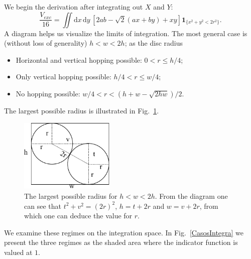 \documentclass[superscriptaddress,pre,reprint,showpacs,twocolumn]{revtex4-1}
\newcommand{\rd}[1]{\mathrm{d}{#1} \,}
\newcommand{\indicatorsymbol}{\mathbf{1}}
\newcommand{\indicator}[1]{\indicatorsymbol_{ \{   #1 \} } }
\begin{document}
We begin the derivation after integrating out $X$ and $Y$:
\begin{equation}\label{volgral2d}
\frac{V_{exc}}{16}  =\iint \rd x \rd y \left[ 2ab-\sqrt{2}(ax+by)+x y \right]
\indicator{x^2+y^2 < 2r^2 }.
\end{equation}
A diagram helps us visualize the limits of integration. The most general
case is (without loss of generality) $h < w < 2h$; as the disc radius 
\begin{itemize}
\item Horizontal and vertical hopping possible: $0 <r \leq h/4$;
\item Only vertical hopping possible: $h/4 < r \leq w/4$;
\item No hopping possible: $w/4 < r < (h+w - \sqrt{2hw}) / 2$.
\end{itemize}
The largest possible radius is illustrated in Fig.~\ref{radiomaximo}.

\begin{figure}[h]
  \centering
  \includegraphics[width=0.4\textwidth]{figures/DiagramaRadioMaximo.pdf}
  \caption{The largest possible radius for $h<w<2h$. From the diagram
    one can see that $t^2+v^2=(2r)^2$, $h=t+2r$ and $w=v+2r$, from which
    one can deduce the value for $r$.}
  \label{radiomaximo}
\end{figure}

We examine these regimes on the integration space.
In Fig.~\ref{CasosIntegra} we present the three regimes as
the shaded area where the indicator function is valued at $1$.
\end{document}
